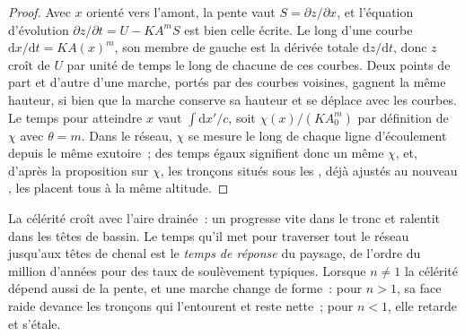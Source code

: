 \begin{proof}
Avec $x$ orienté vers l'amont, la pente vaut $S = \partial z/\partial x$, et
l'équation d'évolution $\partial z/\partial t = U - K A^m S$ est bien celle écrite.
Le long d'une courbe $\mathrm{d}x/\mathrm{d}t = K A(x)^m$, son membre de gauche
est la dérivée totale $\mathrm{d}z/\mathrm{d}t$, donc $z$ croît de $U$ par
unité de temps le long de chacune de ces courbes. Deux points de part et d'autre d'une marche,
portés par des courbes voisines, gagnent la même hauteur, si bien que la marche conserve
sa hauteur et se déplace avec les courbes. Le temps pour atteindre $x$ vaut
$\int \mathrm{d}x'/c$, soit $\chi(x)/(K A_0^m)$ par définition de
$\chi$ avec $\theta = m$. Dans le réseau, $\chi$ se mesure le long de chaque
ligne d'écoulement depuis le même exutoire~; des temps égaux signifient donc un même $\chi$, et, d'après
la proposition sur $\chi$, les tronçons situés sous les , déjà
ajustés au nouveau , les placent tous à la même altitude.
\end{proof}

La célérité croît avec l'aire drainée~: un  progresse vite dans le
tronc et ralentit dans les têtes de bassin. Le temps qu'il met pour traverser tout le
réseau jusqu'aux têtes de chenal est le \emph{temps de réponse} du paysage,
de l'ordre du million d'années pour des taux de soulèvement typiques. Lorsque $n \ne 1$
la célérité dépend aussi de la pente, et une marche change de forme~: pour $n >
1$, sa face raide devance les tronçons qui l'entourent et reste nette~; pour $n <
1$, elle retarde et s'étale.


